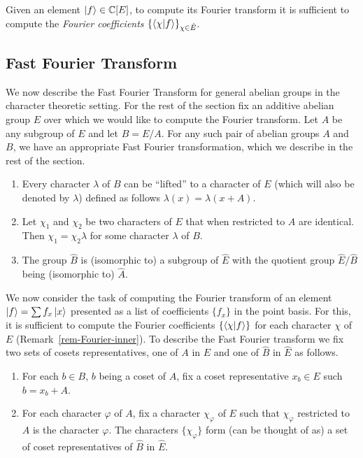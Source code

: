 \documentclass[11pt]{article}
\begin{document}
\begin{remark}\label{rem-Fourier-inner}
Given an element $\left| f \right\rangle \in \mathbb{C}[E]$, to compute its Fourier transform
it is sufficient to compute the \emph{Fourier coefficients}
$\{\langle \chi|f \rangle \}_{\chi \in \hat{E}}$.
\end{remark}

\subsection{Fast Fourier Transform}

We now describe the Fast Fourier Transform for general abelian groups
in the character theoretic setting. For the rest of the section fix an
additive abelian group $E$ over which we would like to compute the
Fourier transform. Let $A$ be any subgroup of $E$ and let $B =
E/A$. For any such pair of abelian groups $A$ and $B$, we have an
appropriate Fast Fourier transformation, which we describe in the rest
of the section.

\begin{proposition}\label{prop-character-lift}
  \begin{enumerate}
  \item Every character $\lambda$ of $B$ can be ``lifted'' to a
    character of $E$ (which will also be denoted by $\lambda$) defined
    as follows $\lambda(x) = \lambda(x + A)$.
  \item Let $\chi_1$ and $\chi_2$ be two characters of $E$ that when
    restricted to $A$ are identical. Then $\chi_1 = \chi_2 \lambda$ for
    some character $\lambda$ of $B$.
  \item The group $\hat{B}$ is (isomorphic to) a subgroup of $\hat{E}$
    with the quotient group $\hat{E}/\hat{B}$ being (isomorphic to)
    $\hat{A}$.
  \end{enumerate}
\end{proposition}


We now consider the task of computing the Fourier transform of an
element $\left| f \right\rangle = \sum f_x \left| x \right\rangle$ presented as a list of
coefficients $\{f_x\}$ in the point basis. For this, it is sufficient
to compute the Fourier coefficients $\{\langle \chi|f \rangle\}$ for each
character $\chi$ of $E$ (Remark~\ref{rem-Fourier-inner}). To describe
the Fast Fourier transform we fix two sets of cosets representatives,
one of $A$ in $E$ and one of $\hat{B}$ in $\hat{E}$ as follows.

\begin{enumerate}
  \item For each $b \in B$, $b$ being a coset of $A$, fix a coset
    representative $x_b \in E$ such $b = x_b + A$.
  \item For each character $\varphi$ of $A$, fix a character
    $\chi_\varphi$ of $E$ such that $\chi_\varphi$ restricted to $A$ is
    the character $\varphi$. The characters $\{ \chi_\varphi \}$ form
    (can be thought of as) a set of coset representatives of $\hat{B}$
    in $\hat{E}$.
\end{enumerate}
\end{document}

